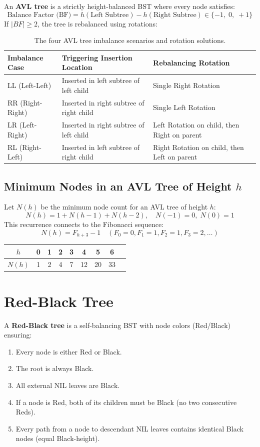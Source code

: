 An \textbf{AVL tree} is a strictly height-balanced BST where every node satisfies:
\[
\boxed{\text{Balance Factor (BF)} = h(\text{Left Subtree}) - h(\text{Right Subtree}) \in \{-1, \; 0, \; +1\}}
\]
If $|BF| \geq 2$, the tree is rebalanced using rotations:
\begin{table}[htbp]
\centering
\small
\begin{tabularx}{\textwidth}{l X X}
\toprule
\textbf{Imbalance Case} & \textbf{Triggering Insertion Location} & \textbf{Rebalancing Rotation} \\
\midrule
LL (Left-Left)   & Inserted in left subtree of left child   & Single Right Rotation \\
RR (Right-Right) & Inserted in right subtree of right child & Single Left Rotation \\
LR (Left-Right)  & Inserted in right subtree of left child  & Left Rotation on child, then Right on parent \\
RL (Right-Left)  & Inserted in left subtree of right child  & Right Rotation on child, then Left on parent \\
\bottomrule
\end{tabularx}
\caption{The four AVL tree imbalance scenarios and rotation solutions.}
\end{table}

\subsection{Minimum Nodes in an AVL Tree of Height $h$}
Let $N(h)$ be the minimum node count for an AVL tree of height $h$:
\[
\boxed{N(h) = 1 + N(h - 1) + N(h - 2)}, \quad N(-1) = 0, \; N(0) = 1
\]
This recurrence connects to the Fibonacci sequence:
\[
\boxed{N(h) = F_{h+3} - 1} \quad (F_0=0, F_1=1, F_2=1, F_3=2, \dots)
\]
\begin{center}
\small
\begin{tabular}{ccccccccc}
\toprule
$h$ & 0 & 1 & 2 & 3 & 4 & 5 & 6 \\
\midrule
$N(h)$ & 1 & 2 & 4 & 7 & 12 & 20 & 33 \\
\bottomrule
\end{tabular}
\end{center}

\section{Red-Black Tree}

A \textbf{Red-Black tree} is a self-balancing BST with node colors (Red/Black) ensuring:
\begin{enumerate}
    \item Every node is either Red or Black.
    \item The root is always Black.
    \item All external NIL leaves are Black.
    \item If a node is Red, both of its children must be Black (no two consecutive Reds).
    \item Every path from a node to descendant NIL leaves contains identical Black nodes (equal Black-height).
\end{enumerate}

